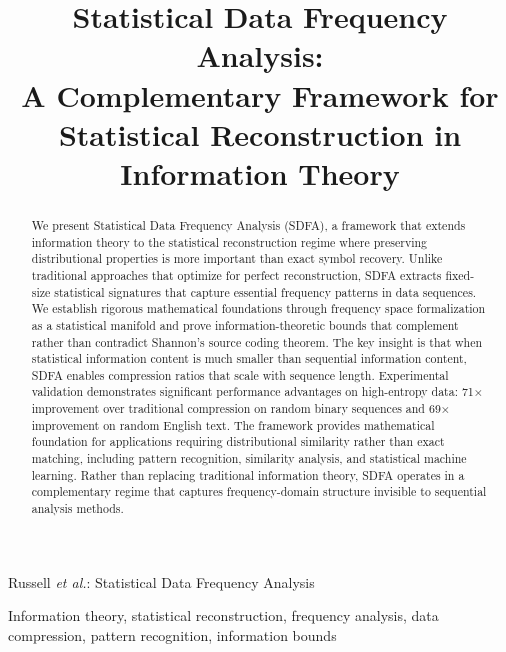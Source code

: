 \documentclass[10pt,journal,compsoc]{IEEEtran}
\newcommand{\sdfa}{\textsc{SDFA}}
\begin{document}
\title{Statistical Data Frequency Analysis: \\ 
A Complementary Framework for Statistical Reconstruction in Information Theory}

\author{
}

%
{Russell \MakeLowercase{\textit{et al.}}: Statistical Data Frequency Analysis}

\maketitle

\begin{abstract}
We present Statistical Data Frequency Analysis (\sdfa), a framework that extends information theory to the statistical reconstruction regime where preserving distributional properties is more important than exact symbol recovery. Unlike traditional approaches that optimize for perfect reconstruction, \sdfa{} extracts fixed-size statistical signatures that capture essential frequency patterns in data sequences. We establish rigorous mathematical foundations through frequency space formalization as a statistical manifold and prove information-theoretic bounds that complement rather than contradict Shannon's source coding theorem. The key insight is that when statistical information content is much smaller than sequential information content, \sdfa{} enables compression ratios that scale with sequence length. Experimental validation demonstrates significant performance advantages on high-entropy data: 71× improvement over traditional compression on random binary sequences and 69× improvement on random English text. The framework provides mathematical foundation for applications requiring distributional similarity rather than exact matching, including pattern recognition, similarity analysis, and statistical machine learning. Rather than replacing traditional information theory, \sdfa{} operates in a complementary regime that captures frequency-domain structure invisible to sequential analysis methods.
\end{abstract}

\begin{IEEEkeywords}
Information theory, statistical reconstruction, frequency analysis, data compression, pattern recognition, information bounds
\end{IEEEkeywords}
\end{document}
